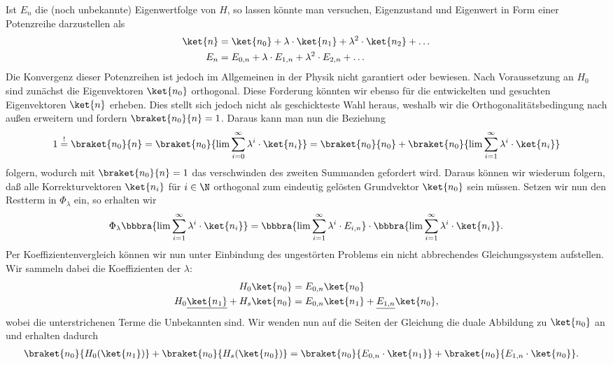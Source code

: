 \documentclass{subfile}
\begin{document}
            Ist $E_n$ die (noch unbekannte) Eigenwertfolge von $H$, so lassen könnte man versuchen, Eigenzustand und Eigenwert in Form einer Potenzreihe darzustellen als
            \begin{align*}
                \ket{n} &= \ket{n_0} + \lambda\cdot\ket{n_1} + \lambda^2\cdot\ket{n_2} + \dots \\
                E_n &= E_{0,n} + \lambda\cdot E_{1,n} + \lambda^2\cdot E_{2,n} + \dots
            \end{align*}
            Die Konvergenz dieser Potenzreihen ist jedoch im Allgemeinen in der Physik nicht garantiert oder bewiesen. Nach Voraussetzung an $H_0$ sind zunächst die Eigenvektoren $\ket{n_0}$ orthogonal. Diese Forderung könnten wir ebenso für die entwickelten und gesuchten Eigenvektoren $\ket{n}$ erheben. Dies stellt sich jedoch nicht als geschickteste Wahl heraus, weshalb wir die Orthogonalitätsbedingung nach außen erweitern und fordern $\braket{n_0}{n} = 1$. Daraus kann man nun die Beziehung
            \[
                1 \stackrel{!}{=} \braket{n_0}{n} = \braket{n_0}{\lim\sum_{i=0}^\infty \lambda^i\cdot\ket{n_i}} = \braket{n_0}{n_0} + \braket{n_0}{\lim\sum_{i=1}^\infty \lambda^i\cdot\ket{n_i}}
            \]
            folgern, wodurch mit $\braket{n_0}{n} = 1$ das verschwinden des zweiten Summanden gefordert wird. Daraus können wir wiederum folgern, daß alle Korrekturvektoren $\ket{n_i}$ für $i\in\N$ orthogonal zum eindeutig gelösten Grundvektor $\ket{n_0}$ sein müssen. Setzen wir nun den Restterm in $\Phi_\lambda$ ein, so erhalten wir 
            \[
                \Phi_\lambda\bbbra{\lim\sum_{i=1}^\infty \lambda^i\cdot\ket{n_i}} = \bbbra{\lim\sum_{i=1}^\infty\lambda^i\cdot E_{i,n}}\cdot\bbbra{\lim\sum_{i=1}^\infty \lambda^i\cdot\ket{n_i}}.
            \]
            Per Koeffizientenvergleich können wir nun unter Einbindung des ungestörten Problems ein nicht abbrechendes Gleichungssystem aufstellen. Wir sammeln dabei die Koeffizienten der $\lambda$:
            \begin{align*}
                H_0\ket{n_0} &= E_{0,n}\ket{n_0} \\
                H_0\underline{\ket{n_1}} + H_s\ket{n_0} &= E_{0,n}\ket{n_1} + \underline{E_{1,n}}\ket{n_0},
            \end{align*}
            wobei die unterstrichenen Terme die Unbekannten sind. Wir wenden nun auf die Seiten der Gleichung die duale Abbildung zu $\ket{n_0}$ an und erhalten dadurch
            \begin{align*}
                \braket{n_0}{H_0(\ket{n_1})} + \braket{n_0}{H_s(\ket{n_0})} &= \braket{n_0}{E_{0,n}\cdot \ket{n_1}} + \braket{n_0}{E_{1,n}\cdot\ket{n_0}}.
            \end{align*}
\end{document}
